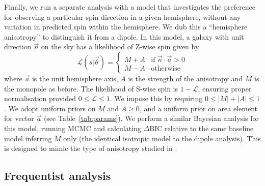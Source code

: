 \documentclass[fleqn,usenatbib,nofootinbib]{mnras}
\begin{document}
Finally, we run a separate analysis with a model that investigates the preference for observing a particular spin direction in a given hemisphere, without any variation in predicted spin within the hemisphere. We dub this a ``hemisphere anisotropy'' to distinguish it from a dipole.
In this model, a galaxy with unit direction $\vec{n}$ on the sky has a likelihood of Z-wise spin given by
\begin{equation}\label{eq:A}
\mathcal{L}(s|\vec{\theta}) =
\begin{cases}
M + A & \text{if } \vec{n} \cdot \vec{a} > 0\\
M - A & \text{otherwise}
\end{cases}
\end{equation}
where $\vec{a}$ is the unit hemisphere axis, $A$ is the strength of the anisotropy and $M$ is the monopole as before.
The likelihood of S-wise spin is $1-\mathcal{L}$, ensuring proper normalisation provided $0 \le \mathcal{L} \le 1$. We impose this by requiring $0 \le |M|+|A| \le 1$.
We adopt uniform priors on ${M}$ and ${A} \geq 0$, and a uniform prior on area element for vector $\vec{a}$ (see Table~\ref{tab:params}). We perform a similar Bayesian analysis for this model, running MCMC and calculating $\Delta$BIC relative to the same baseline model inferring $M$ only (the identical isotropic model to the dipole analysis). This is designed to mimic the type of anisotropy studied in \citet{2024arXiv240317271S}.

\subsection{Frequentist analysis}
\label{sec:meth_freq}
\end{document}
